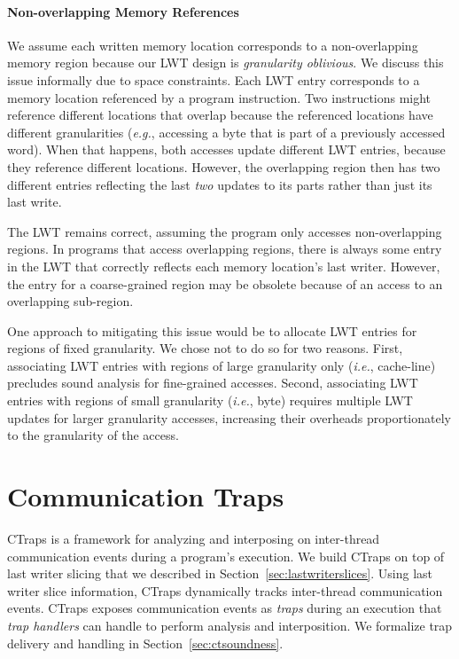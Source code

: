 \documentclass[preprint,9pt]{sigplanconf}
\newcommand{\ctraps}{CTraps\xspace}
\newcommand{\lwt}{LWT\xspace}
\begin{document}




\paragraph{Non-overlapping Memory References} 
We assume each written memory location corresponds to a non-overlapping memory
region because our \lwt design is {\em granularity oblivious}.  We discuss this
issue informally due to space constraints.  Each \lwt entry corresponds to a
memory location referenced by a program instruction.  Two instructions might
reference different locations that overlap because the referenced locations
have different granularities ({\em e.g.}, accessing a byte that is part of a
previously accessed word).  When that happens, both accesses update different
\lwt entries, because they reference different locations.  However, the
overlapping region then has two different entries reflecting the last {\em two}
updates to its parts rather than just its last write.

The \lwt remains correct, assuming the program only accesses non-overlapping
regions.  In programs that access overlapping regions, there is always some
entry in the \lwt that correctly reflects each memory location's last writer.
However, the entry for a coarse-grained region may be obsolete because of an
access to an overlapping sub-region.

One approach to mitigating this issue would be to allocate \lwt entries for
regions of fixed granularity.  We chose not to do so for two reasons.  First,
associating \lwt entries with regions of  large granularity only ({\em i.e.},
cache-line) precludes sound analysis for fine-grained accesses.  Second,
associating \lwt entries with regions of small granularity ({\em i.e.}, byte)
requires multiple \lwt updates for larger granularity accesses, increasing
their overheads proportionately to the granularity of the access.





\section{Communication Traps}
\label{sec:ctraps}

\ctraps is a framework for analyzing and interposing on inter-thread
communication events during a program's execution.  We build \ctraps on top of
last writer slicing that we described in Section~\ref{sec:lastwriterslices}.
Using last writer slice information, \ctraps dynamically tracks 
inter-thread communication events. \ctraps exposes communication
events as {\em traps} during an execution that {\em trap handlers} can handle
to perform analysis and interposition.  We formalize trap delivery and handling
in Section~\ref{sec:ctsoundness}.
\end{document}
